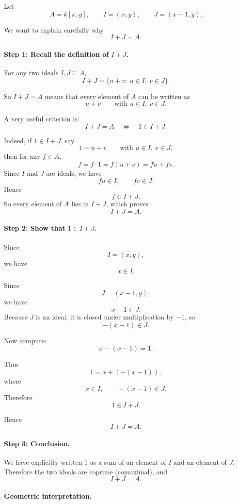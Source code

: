 \documentclass[12pt,a4paper]{article}
\theoremstyle{notespace}
\begin{document}
Let
\[
A=k[x,y],\qquad I=(x,y),\qquad J=(x-1,y).
\]

We want to explain carefully why
\[
I+J=A.
\]

\paragraph{Step 1: Recall the definition of \(I+J\).}

For any two ideals \(I,J\subseteq A\),
\[
I+J=\{u+v:\ u\in I,\ v\in J\}.
\]

So \(I+J=A\) means that every element of \(A\) can be written as
\[
u+v
\qquad\text{with }u\in I,\ v\in J.
\]

A very useful criterion is:
\[
I+J=A
\quad\Longleftrightarrow\quad
1\in I+J.
\]

Indeed, if \(1\in I+J\), say
\[
1=u+v
\qquad\text{with }u\in I,\ v\in J,
\]
then for any \(f\in A\),
\[
f=f\cdot 1=f(u+v)=fu+fv.
\]
Since \(I\) and \(J\) are ideals, we have
\[
fu\in I,\qquad fv\in J.
\]
Hence
\[
f\in I+J.
\]
So every element of \(A\) lies in \(I+J\), which proves
\[
I+J=A.
\]

\paragraph{Step 2: Show that \(1\in I+J\).}

Since
\[
I=(x,y),
\]
we have
\[
x\in I.
\]

Since
\[
J=(x-1,y),
\]
we have
\[
x-1\in J.
\]
Because \(J\) is an ideal, it is closed under multiplication by \(-1\), so
\[
-(x-1)\in J.
\]

Now compute:
\[
x-(x-1)=1.
\]

Thus
\[
1=x+(-(x-1)),
\]
where
\[
x\in I,\qquad -(x-1)\in J.
\]
Therefore
\[
1\in I+J.
\]

Hence
\[
I+J=A.
\]

\paragraph{Step 3: Conclusion.}

We have explicitly written \(1\) as a sum of an element of \(I\) and an element of \(J\). Therefore the two ideals are coprime (comaximal), and
\[
I+J=A.
\]

\paragraph{Geometric interpretation.}
\end{document}
